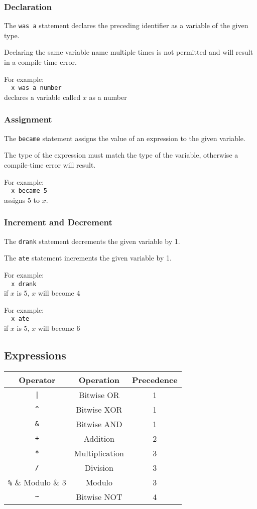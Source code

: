 \documentclass[a4wide, 11pt]{article}
\begin{document}
\subsubsection{Declaration}
The \verb:was a: statement declares the preceding identifier as a variable of
the given type.

Declaring the same variable name multiple times is not permitted and will
result in a compile-time error.

For example:\\
\verb:  x was a number:\\
declares a variable called $x$ as a number

\subsubsection{Assignment}
The \verb:became: statement assigns the value of an expression to the given
variable.

The type of the expression must match the type of the variable, otherwise a
compile-time error will result.

For example:\\
\verb:  x became 5:\\
assigns 5 to $x$.

\subsubsection{Increment and Decrement}
The \verb:drank: statement decrements the given variable by 1.

The \verb:ate: statement increments the given variable by 1.

For example:\\
\verb:  x drank:\\
if $x$ is 5, $x$ will become 4

For example:\\
\verb:  x ate:\\
if $x$ is 5, $x$ will become 6

\subsection{Expressions}
\begin{tabular}{ccc}
Operator & Operation   & Precedence \\
\hline
\hline
\verb:|: & Bitwise OR  & 1 \\
\verb:^: & Bitwise XOR & 1 \\
\verb:&: & Bitwise AND & 1 \\
\hline
\verb:+: & Addition    & 2 \\
\hline
\verb:*: & Multiplication & 3 \\
\verb:/: & Division       & 3 \\
\verb:%: & Modulo         & 3 \\
\hline
\verb:~: & Bitwise NOT    & 4 \\
\end{tabular}
\end{document}
